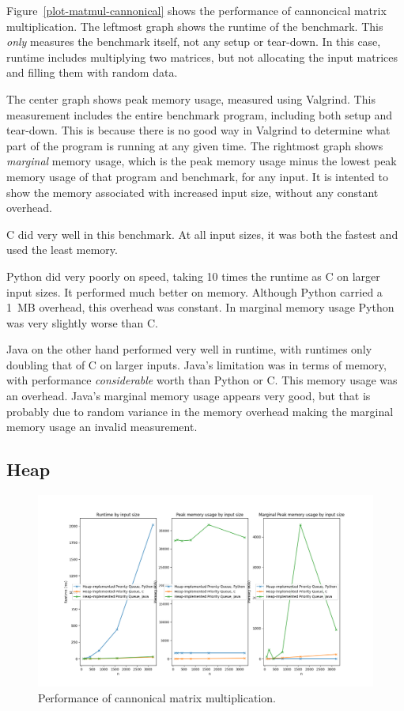 \documentclass[12pt,letterpaper]{article}
\begin{document}
Figure~\ref{plot-matmul-cannonical} shows the performance of cannoncical matrix
multiplication. The leftmost graph shows the runtime of the benchmark. This
\emph{only} measures the benchmark itself, not any setup or tear-down. In this
case, runtime includes multiplying two matrices, but not allocating the input
matrices and filling them with random data.

The center graph shows peak memory usage, measured using Valgrind. This
measurement includes the entire benchmark program, including both setup and
tear-down. This is because there is no good way in Valgrind to determine what
part of the program is running at any given time. The rightmost graph shows
\emph{marginal} memory usage, which is the peak memory usage minus the lowest
peak memory usage of that program and benchmark, for any input. It is intented
to show the memory associated with increased input size, without any constant
overhead.

C did very well in this benchmark. At all input sizes, it was both the fastest
and used the least memory.

Python did very poorly on speed, taking 10 times the runtime as C on larger
input sizes. It performed much better on memory. Although Python carried a
\SI{1}{\mega B} overhead, this overhead was constant. In marginal memory usage
Python was very slightly worse than C.

Java on the other hand performed very well in runtime, with runtimes only
doubling that of C on larger inputs. Java's limitation was in terms of memory,
with performance \emph{considerable} worth than Python or C. This memory usage
was an overhead. Java's marginal memory usage appears very good, but that is
probably due to random variance in the memory overhead making the marginal
memory usage an invalid measurement.

\subsection{Heap}\label{heap}

\begin{figure}[h!]
  \centering
  \includegraphics[width=\textwidth]{./heap-plot.png}
  \caption{Performance of cannonical matrix multiplication.}
  \label{plot-heap}
\end{figure}
\end{document}
